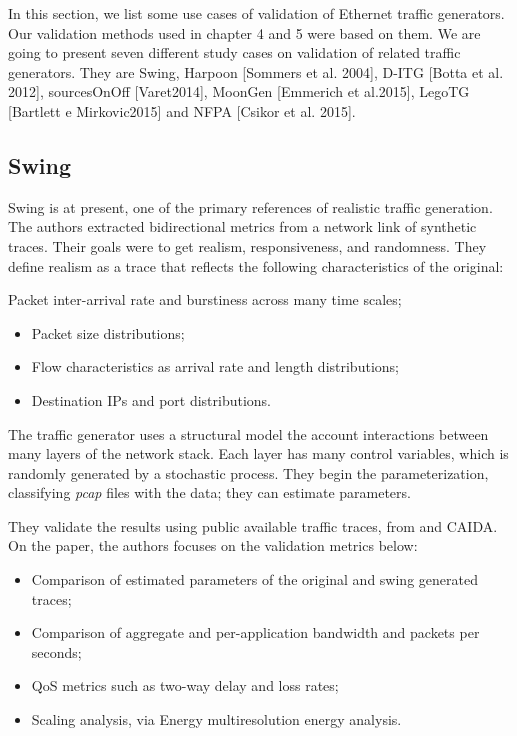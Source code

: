 In this section, we list some use cases of validation of Ethernet traffic generators. Our validation methods used in chapter 4 and 5 were based on them. We are going to present seven different study cases on validation of related traffic generators. They are Swing,   Harpoon [Sommers et al. 2004], D-ITG [Botta et al. 2012], sourcesOnOff  [Varet2014], MoonGen [Emmerich et al.2015], LegoTG [Bartlett e Mirkovic2015] and NFPA [Csikor et al. 2015].

\subsection{Swing}

Swing\cite{swing-paper} is at present, one of the primary references of realistic traffic generation. The authors extracted bidirectional metrics from a network link of synthetic traces. Their goals were to get realism, responsiveness, and randomness. They define realism as a trace that reflects the following characteristics of the original:

Packet inter-arrival rate and burstiness across many time scales;
\begin{itemize}
\item Packet size distributions;
\item Flow characteristics as arrival rate and length distributions;
\item Destination IPs and port distributions.
\end{itemize}

The traffic generator uses a structural model the account interactions between many layers of the network stack. Each layer has many control variables, which is randomly generated by a stochastic process. They begin the parameterization, classifying \cite{web-libpcap} \textit{pcap} files with the data; they can estimate parameters.

They validate the results using public available traffic traces, from \cite{web-mawi} and CAIDA\cite{web-caida}. On the paper, the authors focuses on  the validation metrics below:

\begin{itemize}
\item Comparison of estimated parameters of the original and swing generated traces;
\item Comparison of aggregate and per-application bandwidth and packets per seconds;
\item QoS metrics such as two-way delay and loss rates;
\item Scaling analysis, via Energy multiresolution energy analysis.
\end{itemize}

